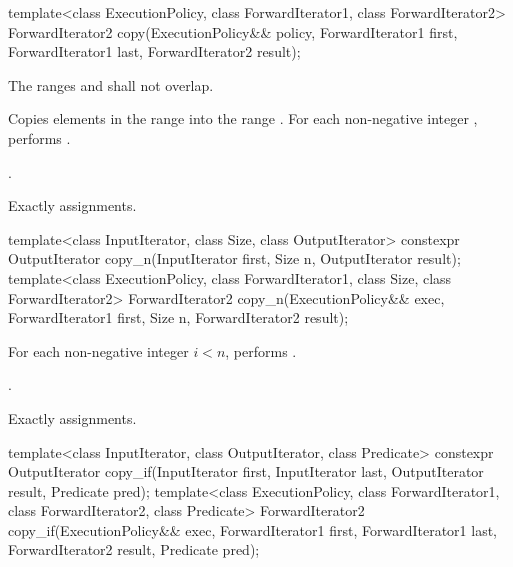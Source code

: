 %
\begin{itemdecl}
template<class ExecutionPolicy, class ForwardIterator1, class ForwardIterator2>
  ForwardIterator2 copy(ExecutionPolicy&& policy,
                        ForwardIterator1 first, ForwardIterator1 last,
                        ForwardIterator2 result);
\end{itemdecl}

\begin{itemdescr}
\pnum
\requires The ranges  and
 shall not overlap.

\pnum
\effects Copies elements in the range  into
the range .
For each non-negative integer ,
performs .

\pnum
\returns {}.

\pnum
\complexity Exactly  assignments.
\end{itemdescr}

%
\begin{itemdecl}
template<class InputIterator, class Size, class OutputIterator>
  constexpr OutputIterator copy_n(InputIterator first, Size n,
                                  OutputIterator result);
template<class ExecutionPolicy, class ForwardIterator1, class Size, class ForwardIterator2>
  ForwardIterator2 copy_n(ExecutionPolicy&& exec,
                          ForwardIterator1 first, Size n,
                          ForwardIterator2 result);
\end{itemdecl}

\begin{itemdescr}
\pnum
\effects For each non-negative integer
$i < n$, performs .

\pnum
\returns {}.

\pnum
\complexity Exactly  assignments.
\end{itemdescr}

%
\begin{itemdecl}
template<class InputIterator, class OutputIterator, class Predicate>
  constexpr OutputIterator copy_if(InputIterator first, InputIterator last,
                                   OutputIterator result, Predicate pred);
template<class ExecutionPolicy, class ForwardIterator1, class ForwardIterator2,
         class Predicate>
  ForwardIterator2 copy_if(ExecutionPolicy&& exec,
                           ForwardIterator1 first, ForwardIterator1 last,
                           ForwardIterator2 result, Predicate pred);
\end{itemdecl}

